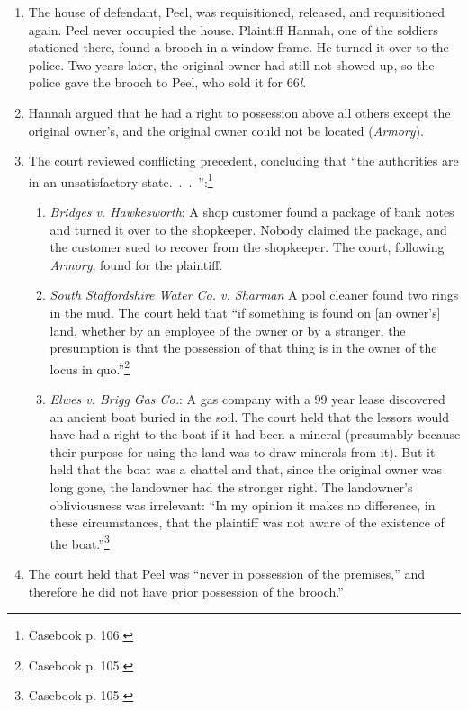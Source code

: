 \begin{enumerate}
    \item The house of defendant, Peel, was requisitioned, released, and 
    requisitioned again. Peel never occupied the house. Plaintiff Hannah, one 
    of the soldiers stationed there, found a brooch in a window frame. He 
    turned it over to the police. Two years later, the original owner had 
    still not showed up, so the police gave the brooch to Peel, who sold it 
    for 66\emph{l}.
    \item Hannah argued that he had a right to possession above all others 
    except the original owner's, and the original owner could not be located 
    (\emph{Armory}).
    \item The court reviewed conflicting precedent, concluding that ``the 
    authorities are in an unsatisfactory state.~.~.~'':\footnote{Casebook p. 
    106.}
    \begin{enumerate}
        \item \emph{Bridges v. Hawkesworth}: A shop customer found a package 
        of bank notes and turned it over to the shopkeeper. Nobody claimed the 
        package, and the customer sued to recover from the shopkeeper. The 
        court, following \emph{Armory}, found for the plaintiff.
        \item \emph{South Staffordshire Water Co. v. Sharman} A pool cleaner 
        found two rings in the mud. The court held that ``if something is 
        found on [an owner's] land, whether by an employee of the owner or by 
        a stranger, the presumption is that the possession of that thing is in 
        the owner of the locus in quo.''\footnote{Casebook p. 105.}
        \item \emph{Elwes v. Brigg Gas Co.}: A gas company with a 99 year 
        lease discovered an ancient boat buried in the soil. The court held 
        that the lessors would have had a right to the boat if it had been a 
        mineral (presumably because their purpose for using the land was to 
        draw minerals from it). But it held that the boat was a chattel and 
        that, since the original owner was long gone, the landowner had the 
        stronger right. The landowner's obliviousness was irrelevant: ``In my 
        opinion it makes no difference, in these circumstances, that the 
        plaintiff was not aware of the existence of the 
        boat.''\footnote{Casebook p. 105.}
    \end{enumerate}
    \item The court held that Peel was ``never in possession of the 
    premises,'' and therefore he did not have prior possession of the 
    brooch.''
\end{enumerate}

